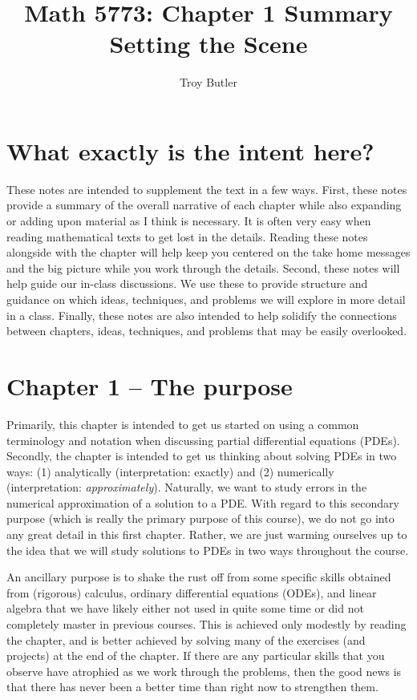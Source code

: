 \documentclass{amsart}
\theoremstyle{plain}
\theoremstyle{definition}
\theoremstyle{remark}
\theoremstyle{definition}
\numberwithin{equation}{section}
\numberwithin{equation}{section}
\begin{document}
\title{Math 5773: Chapter 1 Summary\\ Setting the Scene}
\author{Troy Butler}

\maketitle

\section*{What exactly is the intent here?}

These notes are intended to supplement the text in a few ways.
First, these notes provide a summary of the overall narrative of each chapter while also expanding or adding upon material as I think is necessary.
It is often very easy when reading mathematical texts to get lost in the details.
Reading these notes alongside with the chapter will help keep you centered on the take home messages and the big picture while you work through the details.
Second, these notes will help guide our in-class discussions.
We use these to provide structure and guidance on which ideas, techniques, and problems we will explore in more detail in a class.
Finally, these notes are also intended to help solidify the connections between chapters, ideas, techniques, and problems that may be easily overlooked. 

\setcounter{section}{0}
\section{Chapter 1 -- The purpose}

Primarily, this chapter is intended to get us started on using a common terminology and notation when discussing partial differential equations (PDEs). 
Secondly, the chapter is intended to get us thinking about solving PDEs in two ways: (1) analytically (interpretation: exactly) and (2) numerically (interpretation: {\em approximately}). 
Naturally, we want to study errors in the numerical approximation of a solution to a PDE. 
With regard to this secondary purpose (which is really the primary purpose of this course), we do not go into any great detail in this first chapter.
Rather, we are just warming ourselves up to the idea that we will study solutions to PDEs in two ways throughout the course. 

An ancillary purpose is to shake the rust off from some specific skills obtained from (rigorous) calculus, ordinary differential equations (ODEs), and linear algebra that we have likely either not used in quite some time or did not completely master in previous courses.
This is achieved only modestly by reading the chapter, and is better achieved by solving many of the exercises (and projects) at the end of the chapter. 
If there are any particular skills that you observe have atrophied as we work through the problems, then the good news is that there has never been a better time than right now to strengthen them. 
\end{document}
